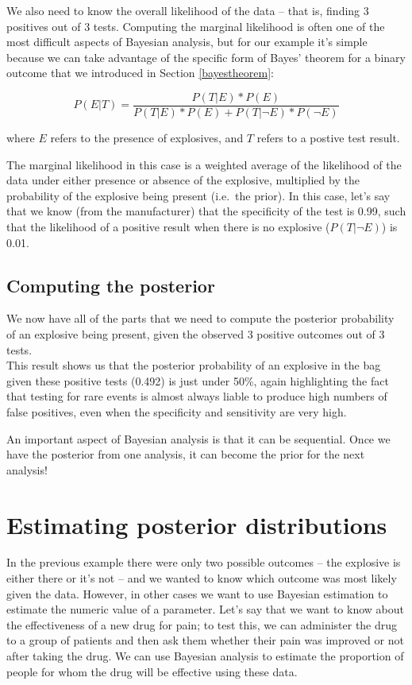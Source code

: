 \documentclass[12pt,]{book}
\theoremstyle{definition}
\theoremstyle{definition}
\theoremstyle{definition}
\theoremstyle{remark}
\begin{document}
We also need to know the overall likelihood of the data -- that is, finding 3 positives out of 3 tests. Computing the marginal likelihood is often one of the most difficult aspects of Bayesian analysis, but for our example it's simple because we can take advantage of the specific form of Bayes' theorem for a binary outcome that we introduced in Section \ref{bayestheorem}:

\[
P(E|T) = \frac{P(T|E)*P(E)}{P(T|E)*P(E) + P(T|\neg E)*P(\neg E)}
\]

where \(E\) refers to the presence of explosives, and \(T\) refers to a postive test result.

The marginal likelihood in this case is a weighted average of the likelihood of the data under either presence or absence of the explosive, multiplied by the probability of the explosive being present (i.e.~the prior). In this case, let's say that we know (from the manufacturer) that the specificity of the test is 0.99, such that the likelihood of a positive result when there is no explosive (\(P(T|\neg E)\)) is 0.01.

\hypertarget{computing-the-posterior}{%
\subsection{Computing the posterior}\label{computing-the-posterior}}

We now have all of the parts that we need to compute the posterior probability of an explosive being present, given the observed 3 positive outcomes out of 3 tests.\\
This result shows us that the posterior probability of an explosive in the bag given these positive tests (0.492) is just under 50\%, again highlighting the fact that testing for rare events is almost always liable to produce high numbers of false positives, even when the specificity and sensitivity are very high.

An important aspect of Bayesian analysis is that it can be sequential. Once we have the posterior from one analysis, it can become the prior for the next analysis!

\hypertarget{estimating-posterior-distributions}{%
\section{Estimating posterior distributions}\label{estimating-posterior-distributions}}

In the previous example there were only two possible outcomes -- the explosive is either there or it's not -- and we wanted to know which outcome was most likely given the data. However, in other cases we want to use Bayesian estimation to estimate the numeric value of a parameter. Let's say that we want to know about the effectiveness of a new drug for pain; to test this, we can administer the drug to a group of patients and then ask them whether their pain was improved or not after taking the drug. We can use Bayesian analysis to estimate the proportion of people for whom the drug will be effective using these data.
\end{document}
